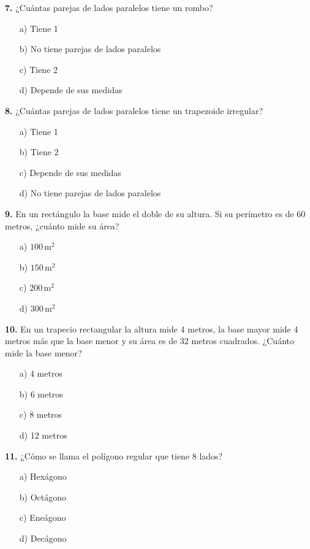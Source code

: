 \noindent\textbf{7.} ¿Cuántas parejas de lados paralelos tiene un rombo?

\begin{itemize}
    \item[a)] Tiene 1
    \item[b)] No tiene parejas de lados paralelos
    \item[c)] Tiene 2
    \item[d)] Depende de sus medidas
\end{itemize}


\noindent\textbf{8.} ¿Cuántas parejas de lados paralelos tiene un trapezoide irregular?

\begin{itemize}
    \item[a)] Tiene 1
    \item[b)] Tiene 2
    \item[c)] Depende de sus medidas
    \item[d)] No tiene parejas de lados paralelos
\end{itemize}


\noindent\textbf{9.} En un rectángulo la base mide el doble de su altura. Si su perímetro es de 60 metros, ¿cuánto mide su área?

\begin{itemize}
    \item[a)] $100\,\text{m}^2$
    \item[b)] $150\,\text{m}^2$
    \item[c)] $200\,\text{m}^2$
    \item[d)] $300\,\text{m}^2$
\end{itemize}


\noindent\textbf{10.} En un trapecio rectangular la altura mide 4 metros, la base mayor mide 4 metros más que la base menor y su área es de 32 metros cuadrados. ¿Cuánto mide la base menor?

\begin{itemize}
    \item[a)] 4 metros
    \item[b)] 6 metros
    \item[c)] 8 metros
    \item[d)] 12 metros
\end{itemize}


\noindent\textbf{11.} ¿Cómo se llama el polígono regular que tiene 8 lados?

\begin{itemize}
    \item[a)] Hexágono
    \item[b)] Octágono
    \item[c)] Eneágono
    \item[d)] Decágono
\end{itemize}


